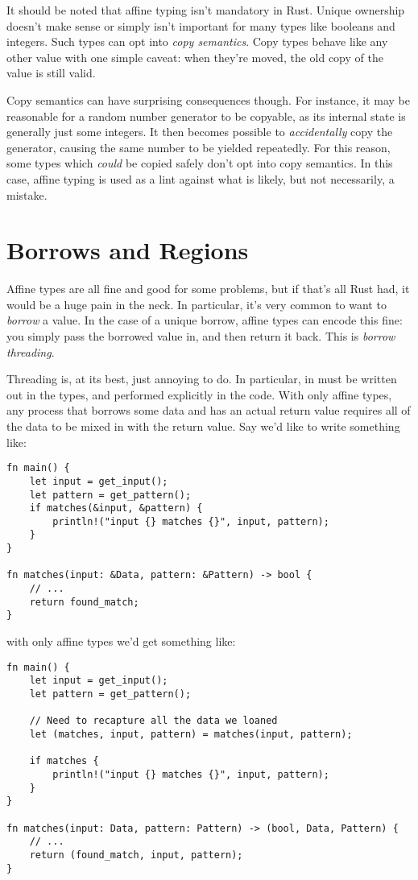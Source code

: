 It should be noted that affine typing isn't mandatory in Rust. Unique ownership
doesn't make sense or simply isn't important for many types like booleans and
integers. Such types can opt into \emph{copy semantics}. Copy types behave like any
other value with one simple caveat: when they're moved, the old copy of the
value is still valid.

Copy semantics can have surprising consequences though. For instance, it may be
reasonable for a random number generator to be copyable, as its internal
state is generally just some integers. It then becomes possible to
\emph{accidentally} copy the generator, causing the same number to be yielded
repeatedly. For this reason, some types which \emph{could} be copied safely don't opt
into copy semantics. In this case, affine typing is used as a lint against what
is likely, but not necessarily, a mistake.





\section{Borrows and Regions}

Affine types are all fine and good for some problems, but if that's all Rust had,
it would be a huge pain in the neck. In particular, it's very common to want
to \emph{borrow} a value. In the case of a unique borrow, affine types can encode
this fine: you simply pass the borrowed value in, and then return it back. This
is \emph{borrow threading}.

Threading is, at its best, just annoying to do. In particular, in must be written
out in the types, and performed explicitly in the code. With only affine types,
any process that borrows some data and has an actual return value requires
all of the data to be mixed in with the return value. Say we'd like to write
something like:

\begin{verbatim}
fn main() {
    let input = get_input();
    let pattern = get_pattern();
    if matches(&input, &pattern) {
        println!("input {} matches {}", input, pattern);
    }
}

fn matches(input: &Data, pattern: &Pattern) -> bool {
    // ...
    return found_match;
}
\end{verbatim}

with only affine types we'd get something like:

\begin{verbatim}
fn main() {
    let input = get_input();
    let pattern = get_pattern();

    // Need to recapture all the data we loaned
    let (matches, input, pattern) = matches(input, pattern);

    if matches {
        println!("input {} matches {}", input, pattern);
    }
}

fn matches(input: Data, pattern: Pattern) -> (bool, Data, Pattern) {
    // ...
    return (found_match, input, pattern);
}
\end{verbatim}

